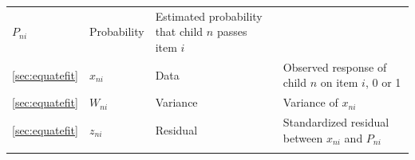 \documentclass[
]{book}
\begin{document}
\begin{longtable}[]{@{}llll@{}}
\begin{minipage}[t]{0.13\columnwidth}
\(P_{ni}\)\strut
\end{minipage} & \begin{minipage}[t]{0.13\columnwidth}\raggedright
Probability\strut
\end{minipage} & \begin{minipage}[t]{0.53\columnwidth}\raggedright
Estimated probability that child \(n\) passes item \(i\)\strut
\end{minipage}\tabularnewline
\begin{minipage}[t]{0.10\columnwidth}\raggedright
\ref{sec:equatefit}\strut
\end{minipage} & \begin{minipage}[t]{0.13\columnwidth}\raggedright
\(x_{ni}\)\strut
\end{minipage} & \begin{minipage}[t]{0.13\columnwidth}\raggedright
Data\strut
\end{minipage} & \begin{minipage}[t]{0.53\columnwidth}\raggedright
Observed response of child \(n\) on item \(i\), 0 or 1\strut
\end{minipage}\tabularnewline
\begin{minipage}[t]{0.10\columnwidth}\raggedright
\ref{sec:equatefit}\strut
\end{minipage} & \begin{minipage}[t]{0.13\columnwidth}\raggedright
\(W_{ni}\)\strut
\end{minipage} & \begin{minipage}[t]{0.13\columnwidth}\raggedright
Variance\strut
\end{minipage} & \begin{minipage}[t]{0.53\columnwidth}\raggedright
Variance of \(x_{ni}\)\strut
\end{minipage}\tabularnewline
\begin{minipage}[t]{0.10\columnwidth}\raggedright
\ref{sec:equatefit}\strut
\end{minipage} & \begin{minipage}[t]{0.13\columnwidth}\raggedright
\(z_{ni}\)\strut
\end{minipage} & \begin{minipage}[t]{0.13\columnwidth}\raggedright
Residual\strut
\end{minipage} & \begin{minipage}[t]{0.53\columnwidth}\raggedright
Standardized residual between \(x_{ni}\) and \(P_{ni}\)\strut
\end{minipage}\tabularnewline
\begin{minipage}[t]{0.10\columnwidth}\raggedright

\end{minipage}
\end{longtable}
\end{document}
